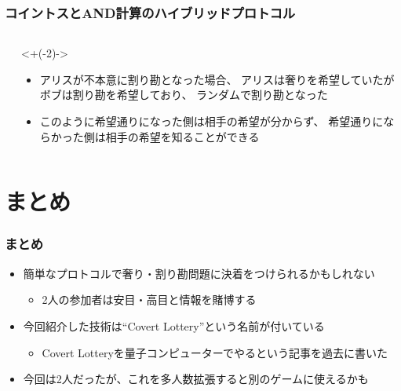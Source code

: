 \begin{frame}
  \frametitle{コイントスとAND計算のハイブリッドプロトコル}

  \begin{columns}
    \begin{column}{0.6\textwidth}

    \end{column}
    \begin{column}{0.4\textwidth}
      \uncover<+(-2)->{
        \begin{itemize}
          \item アリスが不本意に割り勘となった場合、
          アリスは奢りを希望していたがボブは割り勘を希望しており、
          ランダムで割り勘となった

          \item<2-> このように希望通りになった側は相手の希望が分からず、
          希望通りにならかった側は相手の希望を知ることができる
        \end{itemize}
      }
    \end{column}
  \end{columns}
\end{frame}

\section{まとめ}

\begin{frame}
  \frametitle{まとめ}

  \pause
  \begin{itemize}
    \item<+-> 簡単なプロトコルで奢り・割り勘問題に決着をつけられるかもしれない
    \begin{itemize}
      \item 2人の参加者は安目・高目と情報を賭博する
    \end{itemize}

    \item<+-> 今回紹介した技術は``Covert Lottery\cite{covert_lottery}''という名前が付いている
    \begin{itemize}
      \item Covert Lotteryを量子コンピューターでやるという記事\cite{quantum_covert_lottery}を過去に書いた
    \end{itemize}

    \item<+-> 今回は2人だったが、これを多人数拡張すると別のゲームに使えるかも
  \end{itemize}
\end{frame}

